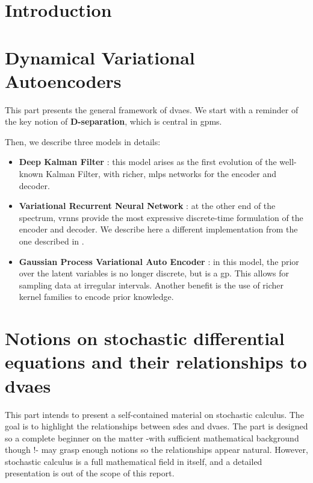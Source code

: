 \documentclass[twoside,11pt]{report}
\begin{document}
\part{Introduction}
    
    
    
    

\part{Dynamical Variational Autoencoders}

This part presents the general framework of \glspl{dvae}. We start with a reminder of the key notion of \textbf{D-separation}, which is central in \glspl{gpm}.

Then, we describe three models in details:
\begin{itemize}
    \item \textbf{Deep Kalman Filter} : this model arises as the first evolution of the well-known Kalman Filter, with richer, \glspl{mlp} networks for the encoder and decoder.
    \item \textbf{Variational Recurrent Neural Network} : at the other end of the spectrum, \glspl{vrnn} provide the most expressive discrete-time formulation of the encoder and decoder.
We describe here a different implementation from the one described in \cite{girin_dynamical_2022}.
    \item \textbf{Gaussian Process Variational Auto Encoder} : in this model, the prior over the latent variables is no longer discrete, but is a \gls{gp}.
This allows for sampling data at irregular intervals. Another benefit is the use of richer kernel families to encode prior knowledge.
\end{itemize}

    
    
    
    
    

\part{Notions on stochastic differential equations and their relationships to \glspl{dvae}}

This part intends to present a self-contained material on stochastic calculus. 
The goal is to highlight the relationships between \glspl{sde} and \glspl{dvae}.
The part is designed so a complete beginner on the matter -with sufficient mathematical background though !- may grasp enough notions so the relationships appear natural.
However, stochastic calculus is a full mathematical field in itself, and a detailed presentation is out of the scope of this report.
\end{document}
